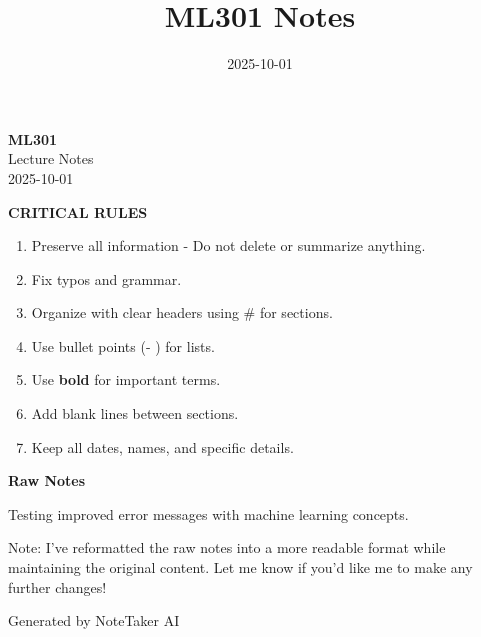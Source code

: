 \documentclass[11pt,a4paper]{article}
\title{\textcolor{primarycolor}{\Huge\textbf{ML301 Notes}}}
\author{}
\date{\textcolor{secondarycolor}{2025-10-01}}
\begin{document}
\begin{center}
    \colorbox{secondarycolor!10}{%
        \parbox{0.95\textwidth}{%
            \centering
            \vspace{0.5cm}
            {\Huge\textcolor{primarycolor}{\textbf{ML301}}} \\[0.5cm]
            {\Large Lecture Notes} \\[0.3cm]
            {\large\textcolor{secondarycolor}{2025-10-01}}
            \vspace{0.5cm}
        }
    }
\end{center}

\vspace{1cm}

\textbf{CRITICAL RULES}

\begin{enumerate}
  \item Preserve all information - Do not delete or summarize anything.
  \item Fix typos and grammar.
  \item Organize with clear headers using # for sections.
  \item Use bullet points (- ) for lists.
  \item Use \textbf{bold} for important terms.
  \item Add blank lines between sections.
  \item Keep all dates, names, and specific details.
\end{enumerate}

\textbf{Raw Notes}

Testing improved error messages with machine learning concepts.

Note: I've reformatted the raw notes into a more readable format while maintaining the original content. Let me know if you'd like me to make any further changes!

\vspace{1cm}

\begin{center}
\textcolor{secondarycolor}{\small Generated by NoteTaker AI}
\end{center}
\end{document}

